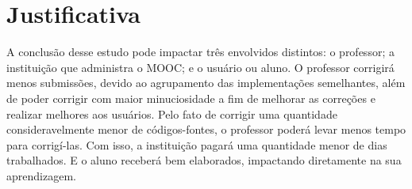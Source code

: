 \chapter{Justificativa}

A conclusão desse estudo pode impactar três envolvidos distintos: o professor;
a instituição que administra o \acs{MOOC}; e o usuário ou aluno. O professor
corrigirá menos submissões, devido ao agrupamento das implementações semelhantes,
além de poder corrigir com maior minuciosidade a fim de melhorar as correções e
realizar melhores  aos usuários. Pelo fato de corrigir uma
quantidade consideravelmente menor de códigos-fontes, o professor poderá levar
menos tempo para corrigí-las. Com isso, a instituição pagará uma quantidade menor
de dias trabalhados. E o aluno receberá  bem elaborados,
impactando diretamente na sua aprendizagem.